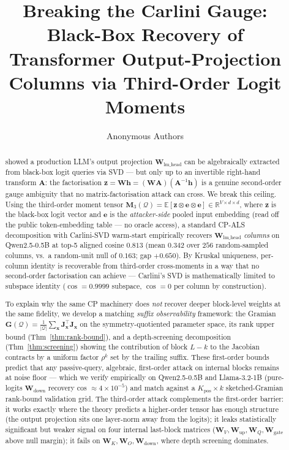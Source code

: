 \documentclass{article}
\title{Breaking the Carlini Gauge:\\Black-Box Recovery of Transformer Output-Projection Columns via Third-Order Logit Moments}
\author{
 Anonymous Authors
}
\newcommand{\R}{\mathbb{R}}
\newcommand{\E}{\mathbb{E}}
\newcommand{\cQ}{\mathcal{Q}}
\newcommand{\bz}{\mathbf{z}}
\newcommand{\bh}{\mathbf{h}}
\newcommand{\bx}{\mathbf{x}}
\newcommand{\bW}{\mathbf{W}}
\newcommand{\bJ}{\mathbf{J}}
\newcommand{\bG}{\mathbf{G}}
\newcommand{\bM}{\mathbf{M}}
\newcommand{\bA}{\mathbf{A}}
\newcommand{\be}{\mathbf{e}}
\begin{document}
\maketitle

\begin{abstract}
\citet{carlini2024stealing} showed a production LLM's output projection $\bW_{\text{lm\_head}}$ can be algebraically extracted from black-box logit queries via SVD --- but only up to an invertible right-hand transform $\bA$: the factorisation $\bz = \bW\bh = (\bW\bA)(\bA^{-1}\bh)$ is a genuine second-order gauge ambiguity that no matrix-factorisation attack can cross. We break this ceiling. Using the third-order moment tensor $\bM_3(\cQ) = \E[\bz \otimes \be \otimes \be] \in \R^{V \times d \times d}$, where $\bz$ is the black-box logit vector and $\be$ is the \emph{attacker-side} pooled input embedding (read off the public token-embedding table --- no oracle access), a standard CP-ALS decomposition with Carlini-SVD warm-start empirically recovers $\bW_{\text{lm\_head}}$ \emph{columns} on Qwen2.5-0.5B at top-5 aligned cosine $\mathbf{0.813}$ (mean $0.342$ over $256$ random-sampled columns, vs.\ a random-unit null of $0.163$; gap $+0.650$). By Kruskal uniqueness, per-column identity is recoverable from third-order cross-moments in a way that no second-order factorisation can achieve --- Carlini's SVD is mathematically limited to subspace identity ($\cos = 0.9999$ subspace, $\cos = 0$ per column by construction).

To explain why the same CP machinery does \emph{not} recover deeper block-level weights at the same fidelity, we develop a matching \emph{suffix observability} framework: the Gramian $\bG(\cQ) = \frac{1}{|\cQ|}\sum_\bx \bJ_\bx^\top \bJ_\bx$ on the symmetry-quotiented parameter space, its rank upper bound (Thm~\ref{thm:rank-bound}), and a depth-screening decomposition (Thm~\ref{thm:screening}) showing the contribution of block $L-k$ to the Jacobian contracts by a uniform factor $\rho^k$ set by the trailing suffix. These first-order bounds predict that any passive-query, algebraic, first-order attack on internal blocks remains at noise floor --- which we verify empirically on Qwen2.5-0.5B and Llama-3.2-1B (pure-logits $\bW_\text{down}$ recovery cos $\approx 4\times 10^{-5}$) and match against a $K_{\text{pos}} \times k$ sketched-Gramian rank-bound validation grid. The third-order attack complements the first-order barrier: it works exactly where the theory predicts a higher-order tensor has enough structure (the output projection sits one layer-norm away from the logits); it leaks statistically significant but weaker signal on four internal last-block matrices ($\bW_V, \bW_\text{up}, \bW_Q, \bW_\text{gate}$ above null margin); it fails on $\bW_K, \bW_O, \bW_\text{down}$, where depth screening dominates.


\end{abstract}
\end{document}
